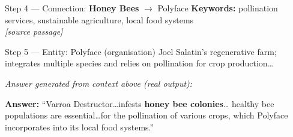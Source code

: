 \documentclass{article}
\begin{document}
\begin{minipage}[t]{0.485\textwidth}
\begin{tcolorbox}
\vspace{2pt}

\begin{connbox}{Step 4 — Connection: \textbf{Honey Bees} $\rightarrow$ Polyface}
\scriptsize\sffamily
\textbf{Keywords:} pollination services, sustainable agriculture, local food systems\\[-1pt]
\textit{\color{gray!60}[source passage]}
\end{connbox}

\vspace{2pt}

\begin{entitybox}{Step 5 — Entity: Polyface \normalfont\color{graspblue!60}(organisation)}
\scriptsize\sffamily
Joel Salatin's regenerative farm; integrates multiple species
and relies on pollination for crop production\ldots
\end{entitybox}

\vspace{4pt}
{\tiny\sffamily\color{graspblue!60}\textit{Answer generated from context above (real output):}}
\begin{tcolorbox}[colback=wincallout!8, colframe=wincallout!50,
  boxrule=0.7pt, arc=3pt, top=2pt, bottom=2pt, left=4pt, right=4pt]
\scriptsize\sffamily\color{wincallout!80!black}
\textbf{Answer:} ``Varroa Destructor\ldots infests \textbf{honey bee colonies}\ldots
healthy bee populations are essential\ldots for the pollination of
various crops, which Polyface incorporates into its local food systems.''
\end{tcolorbox}

\end{tcolorbox}
\end{minipage}
\hfill
\end{document}
